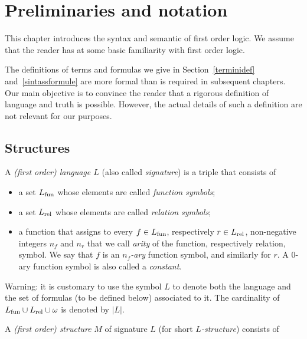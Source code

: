 \chapter{Preliminaries and notation}\label{termini}
This chapter introduces the syntax and semantic of first order logic. We assume that the reader has at some basic familiarity with first order logic. 

The definitions of terms and formulas we give in Section~\ref{terminidef} and~\ref{sintassformule} are more formal than is required in subsequent chapters. Our main objective is to convince the reader that a rigorous definition of language and truth is possible. However, the actual details of such a definition are not relevant for our purposes.


\section{Structures}

A \emph{(first order) language $L$\/}  (also called \emph{signature\/}) is a triple that consists of

\begin{itemize}
\item[1.] a set \emph{$L_{\rm fun}$} whose elements are called \emph{function symbols};
\item[2.] a set \emph{$L_{\rm rel}$\/} whose elements are called \emph{relation symbols};
\item[3.] a function that assigns to every $f\in L_{\rm fun}$, respectively $r\in L_{\rm rel}$, non-negative integers $n_f$ and $n_r$ that we call \emph{arity\/} of the function, respectively relation, symbol. We say that $f$ is an \emph{$n_f$-ary} function symbol, and similarly for $r$. A $0$-ary function symbol is also called a \emph{constant\/}.
\end{itemize}

Warning: it is customary to use the symbol \emph{$L$} to denote both the language and the set of formulas (to be defined below) associated to it. The cardinality of $L_{\rm fun}\cup L_{\rm rel}\cup\omega$ is denoted by \emph{$|L|$}.

A \emph{(first order) structure\/} $M$ of signature $L$ (for short \emph{$L$-structure}) consists of

